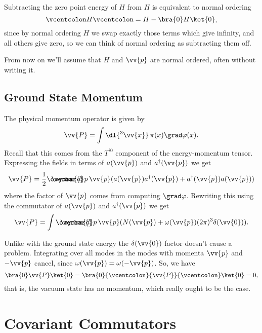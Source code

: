 \documentclass[fleqn]{NotesClass}
\newcommand{\hermit}{{\dagger}}
\newcommand\dbar{\ThisStyle{\ensurestackMath{%
            \stackengine{-.3\LMpt}{\SavedStyle \symrm{d}}{\SavedStyle\overbar{}%
                \mkern2.25mu}{O}{r}{F}{F}{L}}}}
\newcommand{\invariantmeasure}[1]{\dbar #1}
\newcommand{\normalordering}[1]{{\vcentcolon}{#1}{\vcentcolon}}
\begin{document}
    Subtracting the zero point energy of \(H\) from \(H\) is equivalent to normal ordering
    \begin{equation}
        \normalordering{H} = H - \bra{0} H \ket{0},
    \end{equation}
    since by normal ordering \(H\) we swap exactly those terms which give infinity, and all others give zero, so we can think of normal ordering as subtracting them off.
    
    From now on we'll assume that \(H\) and \(\vv{p}\) are normal ordered, often without writing it.
    
    \section{Ground State Momentum}
    The physical momentum operator is given by
    \begin{equation}
        \vv{P} = \int \dl{^3 \vv{x}} \, \pi(x) \grad\varphi(x).
    \end{equation}
    Recall that this comes from the \(T^{i0}\) component of the energy-momentum tensor.
    Expressing the fields in terms of \(a(\vv{p})\) and \(a^\hermit(\vv{p})\) we get
    \begin{equation}
        \vv{P} = \frac{1}{2} \invariantmeasure{p} \, \vv{p} (a(\vv{p}) a^\hermit(\vv{p}) + a^\hermit(\vv{p})a(\vv{p}))
    \end{equation}
    where the factor of \(\vv{p}\) comes from computing \(\grad\varphi\).
    Rewriting this using the commutator of \(a(\vv{p})\) and \(a^\hermit(\vv{p})\) we get
    \begin{equation}
        \vv{P} = \int \invariantmeasure{p} \, \vv{p}(N(\vv{p}) + \omega(\vv{p})(2\pi)^3\delta(\vv{0})).
    \end{equation}
    
    Unlike with the ground state energy the \(\delta(\vv{0})\) factor doesn't cause a problem.
    Integrating over all modes in the modes with momenta \(\vv{p}\) and \(-\vv{p}\) cancel, since \(\omega(\vv{p}) = \omega(-\vv{p})\).
    So, we have
    \begin{equation}
        \bra{0} \vv{P} \ket{0} = \bra{0} \normalordering{\vv{P}} \ket{0} = 0,
    \end{equation}
    that is, the vacuum state has no momentum, which really ought to be the case.
    
    \chapter{Covariant Commutators}
\end{document}
